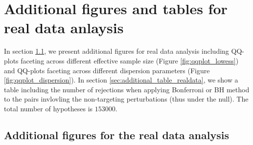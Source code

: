 \documentclass[12pt]{article}
\theoremstyle{definition}
\begin{document}


















\newpage

\section{Additional figures and tables for real data anlaysis}

{\color{red}

In section \ref{sec:additional_figure_realdata}, we present additional figures for real data analysis including QQ-plots faceting across different effective sample size (Figure \ref{fig:qqplot_lowess}) and QQ-plots faceting across different dispersion parameters (Figure \ref{fig:qqplot_dispersion}). In section \ref{sec:additional_table_realdata}, we show a table including the number of rejections when applying Bonferroni or BH method to the pairs invlovling the non-targeting perturbations (thus under the null). The total number of hypotheses is $153000$.
}

\subsection{Additional figures for the real data analysis}\label{sec:additional_figure_realdata}
\end{document}
